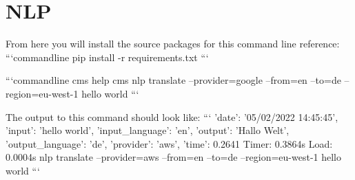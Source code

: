 
\section{NLP}

From here you will install the source packages for this command line reference:
```commandline
pip install -r requirements.txt
```

```commandline
cms help
cms nlp translate --provider=google --from=en --to=de --region=eu-west-1 hello world
```

The output to this command should look like:
```
{'date': '05/02/2022 14:45:45',
 'input': 'hello world',
 'input_language': 'en',
 'output': 'Hallo Welt',
 'output_language': 'de',
 'provider': 'aws',
 'time': 0.2641}
Timer: 0.3864s Load: 0.0004s nlp translate --provider=aws --from=en --to=de --region=eu-west-1 hello world
```
